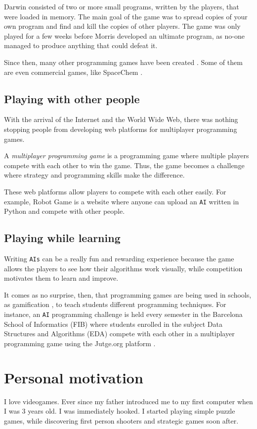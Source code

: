 \documentclass[a4paper,11pt,titlepage,abstract,numbers=noenddot,automark,mnsy,intlimits,rgb,dvipsnames]{report}
\begin{document}
Darwin consisted of two or more small programs, written by the players, that were loaded in memory. The main goal
of the game was to spread copies of your own program and find and kill the copies of other players. The game was only
played for a few weeks before Morris developed an ultimate program, as no-one managed to produce anything that could
defeat it.

Since then, many other programming games have been created \cite{pg}. Some of them are even commercial games, like
SpaceChem \cite{spacechem}.
\subsection{Playing with other people}
With the arrival of the Internet and the World Wide Web, there was nothing stopping people from
developing web platforms for multiplayer programming games.

A \emph{multiplayer programming game} is a programming game where multiple players compete with each other to win the
game. Thus, the game becomes a challenge where strategy and programming skills make the difference.

These web platforms allow players to compete with each other easily. For example, Robot Game
\cite{robotgame} is a website where anyone can upload an \texttt{AI} written in \texttt{}Python\texttt{} and compete with other people.
\subsection{Playing while learning}
Writing \texttt{AIs} can be a really fun and rewarding experience because the game allows the players to see how their
algorithms work visually, while competition motivates them to learn and improve.

It comes as no surprise, then, that programming games are being used in schools, as gamification \cite{gamification},
to teach students different programming techniques.
For instance, an \texttt{AI} programming challenge is held every semester in the Barcelona School of
Informatics (FIB) where students enrolled in the subject Data Structures and Algorithms (EDA) \cite{eda}
compete with each other in a multiplayer programming game using the Jutge.org platform \cite{jutge}.
\section{Personal motivation}
I love videogames. Ever since my father introduced me to my first computer when I was 3 years old.
I was immediately hooked. I started playing simple puzzle games, while discovering first person shooters and strategic
games soon after.
\end{document}

